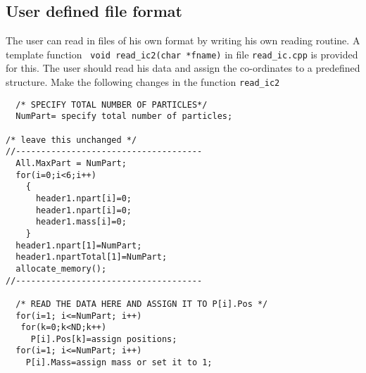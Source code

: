 \documentclass{article}
\begin{document}
\subsection{User defined file format}
The user can read in files of his own format by writing his own
reading routine. A template function \verb$ void read_ic2(char *fname)$ 
in file \verb$read_ic.cpp$ is provided for this.
The user should read his data and assign the co-ordinates to
a predefined structure. 
Make the following changes in the function \verb$read_ic2$
\begin{verbatim}
  /* SPECIFY TOTAL NUMBER OF PARTICLES*/
  NumPart= specify total number of particles;

/* leave this unchanged */
//-------------------------------------
  All.MaxPart = NumPart; 
  for(i=0;i<6;i++)
    {
      header1.npart[i]=0;
      header1.npart[i]=0;
      header1.mass[i]=0;
    }
  header1.npart[1]=NumPart;
  header1.npartTotal[1]=NumPart;
  allocate_memory();
//-------------------------------------

  /* READ THE DATA HERE AND ASSIGN IT TO P[i].Pos */
  for(i=1; i<=NumPart; i++) 
   for(k=0;k<ND;k++)
     P[i].Pos[k]=assign positions;
  for(i=1; i<=NumPart; i++) 
    P[i].Mass=assign mass or set it to 1;
\end{verbatim}
\end{document}
